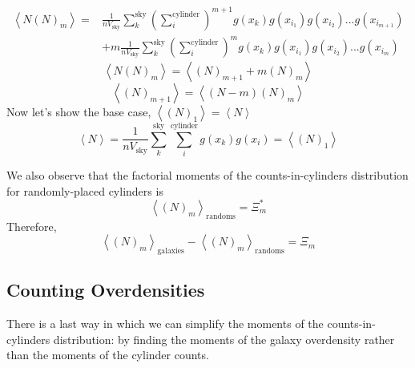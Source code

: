 \documentclass[fleqn,usenatbib]{mnras}
\begin{document}
\begin{multline}
\left<N(N)_m\right> =  &\frac{1}{nV_{\text{sky}}}\sum_k^{\text{sky}}\left(\sum_i^{\text{cylinder}}\right)^{m+1} g(x_k)  g(x_{i_1})g(x_{i_2})...g(x_{i_{m+1}}) \\
& + m\frac{1}{nV_{\text{sky}}}\sum_k^{\text{sky}}\left(\sum_i^{\text{cylinder}}\right)^{m} g(x_k)  g(x_{i_1})g(x_{i_2})...g(x_{i_{m}})
\end{multline}
\begin{equation}
\left<N(N)_m\right>= \left<(N)_{m+1}+m(N)_m\right>
\end{equation}
\begin{equation}
\left<(N)_{m+1}\right>= \left<(N-m)(N)_m\right>
\end{equation}
Now let's show the base case, $\left<(N)_1\right> = \left<N\right>$
\begin{equation}
\left<N\right> = \frac{1}{nV_{\text{sky}}}\sum_k^{\text{sky}}\sum_i^{\text{cylinder}}g(x_k)g(x_i) = \left<(N)_1\right>
\end{equation}

We also observe that the factorial moments of the counts-in-cylinders distribution for randomly-placed cylinders is 
\begin{equation}
\left<(N)_m\right>_{\text{randoms}} = \Xi^*_m    
\end{equation}
Therefore,
\begin{equation}
\left<(N)_m\right>_{\text{galaxies}} - \left<(N)_m\right>_{\text{randoms}} = \Xi_m
\end{equation}

\subsection*{Counting Overdensities}
There is a last way in which we can simplify the moments of the counts-in-cylinders distribution: by finding the moments of the galaxy overdensity rather than the moments of the cylinder counts.
\end{document}
